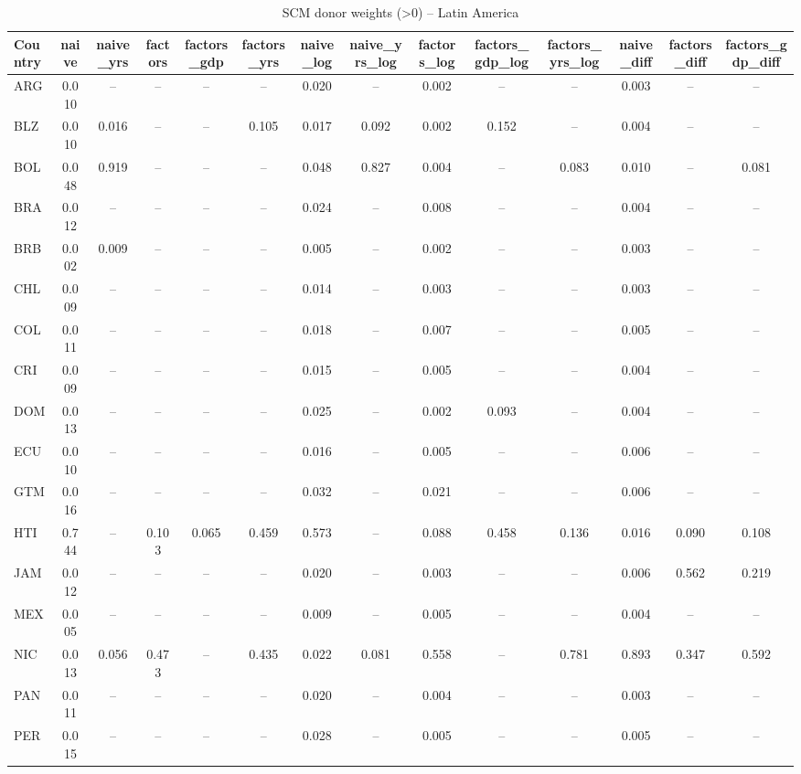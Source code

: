 \begin{longtable}{l*{13}{c}}
\caption{SCM donor weights (>0) -- Latin America}\label{tab:weights-latin_america}\\
\toprule
Country & naive & naive\_yrs & factors & factors\_gdp & factors\_yrs & naive\_log & naive\_yrs\_log & factors\_log & factors\_gdp\_log & factors\_yrs\_log & naive\_diff & factors\_diff & factors\_gdp\_diff \\
\midrule
ARG & 0.010 & -- & -- & -- & -- & 0.020 & -- & 0.002 & -- & -- & 0.003 & -- & -- \\
BLZ & 0.010 & 0.016 & -- & -- & 0.105 & 0.017 & 0.092 & 0.002 & 0.152 & -- & 0.004 & -- & -- \\
BOL & 0.048 & 0.919 & -- & -- & -- & 0.048 & 0.827 & 0.004 & -- & 0.083 & 0.010 & -- & 0.081 \\
BRA & 0.012 & -- & -- & -- & -- & 0.024 & -- & 0.008 & -- & -- & 0.004 & -- & -- \\
BRB & 0.002 & 0.009 & -- & -- & -- & 0.005 & -- & 0.002 & -- & -- & 0.003 & -- & -- \\
CHL & 0.009 & -- & -- & -- & -- & 0.014 & -- & 0.003 & -- & -- & 0.003 & -- & -- \\
COL & 0.011 & -- & -- & -- & -- & 0.018 & -- & 0.007 & -- & -- & 0.005 & -- & -- \\
CRI & 0.009 & -- & -- & -- & -- & 0.015 & -- & 0.005 & -- & -- & 0.004 & -- & -- \\
DOM & 0.013 & -- & -- & -- & -- & 0.025 & -- & 0.002 & 0.093 & -- & 0.004 & -- & -- \\
ECU & 0.010 & -- & -- & -- & -- & 0.016 & -- & 0.005 & -- & -- & 0.006 & -- & -- \\
GTM & 0.016 & -- & -- & -- & -- & 0.032 & -- & 0.021 & -- & -- & 0.006 & -- & -- \\
HTI & 0.744 & -- & 0.103 & 0.065 & 0.459 & 0.573 & -- & 0.088 & 0.458 & 0.136 & 0.016 & 0.090 & 0.108 \\
JAM & 0.012 & -- & -- & -- & -- & 0.020 & -- & 0.003 & -- & -- & 0.006 & 0.562 & 0.219 \\
MEX & 0.005 & -- & -- & -- & -- & 0.009 & -- & 0.005 & -- & -- & 0.004 & -- & -- \\
NIC & 0.013 & 0.056 & 0.473 & -- & 0.435 & 0.022 & 0.081 & 0.558 & -- & 0.781 & 0.893 & 0.347 & 0.592 \\
PAN & 0.011 & -- & -- & -- & -- & 0.020 & -- & 0.004 & -- & -- & 0.003 & -- & -- \\
PER & 0.015 & -- & -- & -- & -- & 0.028 & -- & 0.005 & -- & -- & 0.005 & -- & -- \\

\end{longtable}
